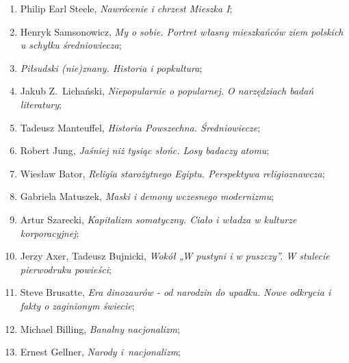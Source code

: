 \documentclass[a4paper,11pt]{article}
\begin{document}
\begin{enumerate}
\item Philip Earl Steele, \textit{Nawrócenie i chrzest Mieszka I};



\item Henryk Samsonowicz, \textit{My o sobie. Portret własny mieszkańców
    ziem polskich u schyłku średniowiecza};



\item \textit{Piłsudski (nie)znany. Historia i popkultura};



\item Jakub Z.~Lichański, \textit{Niepopularnie o popularnej. O
    narzędziach badań literatury};



\item Tadeusz Manteuffel, \textit{Historia Powszechna. Średniowiecze};



\item Robert Jung, \textit{Jaśniej niż tysiąc słońc. Losy badaczy
    atomu};



\item Wiesław Bator, \textit{Religia starożytnego Egiptu. Perspektywa
    religioznawcza};



\item Gabriela Matuszek, \textit{Maski i demony wczesnego modernizmu};



\item Artur Szarecki, \textit{Kapitalizm somatyczny. Ciało i władza w
    kulturze korporacyjnej};



\item Jerzy Axer, Tadeusz Bujnicki, \textit{Wokół „W pustyni i w
    puszczy”. W stulecie pierwodruku powieści};



\item Steve Brusatte, \textit{Era dinozaurów - od narodzin do upadku.
    Nowe odkrycia i fakty o zaginionym świecie};



\item Michael Billing, \textit{Banalny nacjonalizm};



\item Ernest Gellner, \textit{Narody i~nacjonalizm};




\end{enumerate}
\end{document}
